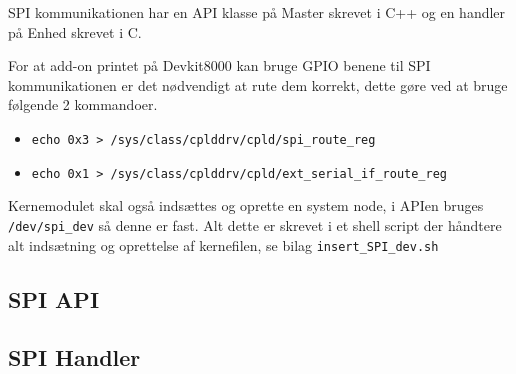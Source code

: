 


SPI kommunikationen har en API klasse på Master skrevet i C++ og en handler på Enhed skrevet i C.

For at add-on printet på Devkit8000 kan bruge GPIO benene til SPI kommunikationen er det nødvendigt at rute dem korrekt, dette gøre ved at bruge følgende 2 kommandoer.

\begin{itemize}
\item \verb+echo 0x3 > /sys/class/cplddrv/cpld/spi_route_reg+
\item \verb+echo 0x1 > /sys/class/cplddrv/cpld/ext_serial_if_route_reg+
\end{itemize}

Kernemodulet skal også indsættes og oprette en system node, i APIen bruges \verb+/dev/spi_dev+ så denne er fast.
Alt dette er skrevet i et shell script der håndtere alt indsætning og oprettelse af kernefilen, se bilag \verb+insert_SPI_dev.sh+


\subsection{SPI API}
%





\subsection{SPI Handler}
%


